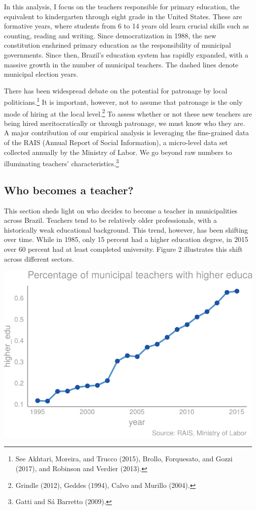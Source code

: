 \documentclass[12pt,]{article}
\let\rmarkdownfootnote\footnote%
\def\footnote{\protect\rmarkdownfootnote}
\begin{document}
In this analysis, I focus on the teachers responsible for primary
education, the equivalent to kindergarten through eight grade in the
United States. These are formative years, where students from 6 to 14
years old learn crucial skills such as counting, reading and writing.
Since democratization in 1988, the new constitution enshrined primary
education as the responsibility of municipal governments. Since then,
Brazil's education system has rapidly expanded, with a massive growth in
the number of municipal teachers. The dashed lines denote municipal
election years.

There has been widespread debate on the potential for patronage by local
politicians.\footnote{See Akhtari, Moreira, and Trucco (2015), Brollo,
  Forquesato, and Gozzi (2017), and Robinson and Verdier (2013).} It is
important, however, not to assume that patronage is the only mode of
hiring at the local level.\footnote{Grindle (2012), Geddes (1994), Calvo
  and Murillo (2004).} To assess whether or not these new teachers are
being hired meritocratically or through patronage, we must know who they
are. A major contribution of our empirical analysis is leveraging the
fine-grained data of the RAIS (Annual Report of Social Information), a
micro-level data set collected annually by the Ministry of Labor. We go
beyond raw numbers to illuminating teachers' characteristics.\footnote{Gatti
  and Sá Barretto (2009).}

\subsection{Who becomes a teacher?}

This section sheds light on who decides to become a teacher in
municipalities across Brazil. Teachers tend to be relatively older
professionals, with a historically weak educational background. This
trend, however, has been shifting over time. While in 1985, only 15
percent had a higher education degree, in 2015 over 60 percent had at
least completed university. Figure 2 illustrates this shift across
different sectors.

\begin{center}\includegraphics{dissertation_files/figure-latex/unnamed-chunk-18-1} \end{center}
\end{document}
